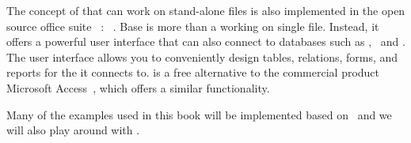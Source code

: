 The concept of  that can work on stand-alone files is also implemented in the open source office suite \libreoffice~\cite{DF2024LTDF,GL2012LTSOOSSCBAFACSOL,S2022L7PFEUU}: \libreofficeBase~\cite{FNFHWSKLSSGLFRSRPLJG2022BG7R1BOL7C,S2022L7PFEUU}.
Base is more than a  working on single file.
Instead, it offers a powerful user interface that can also connect to databases such as \mysql, \mariadb\ and \postgresql.
The user interface allows you to conveniently design tables, relations, forms, and reports for the  it connects to.
 is a free alternative to the commercial product Microsoft Access~\cite{SSI2023MA2BTA,B2020HOMA2,UC2021AFD}, which offers a similar functionality.

Many of the examples used in this book will be implemented based on \postgresql\ and we will also play around with \libreofficeBase.%
%
\endhsection
%
\endhsection%
%
